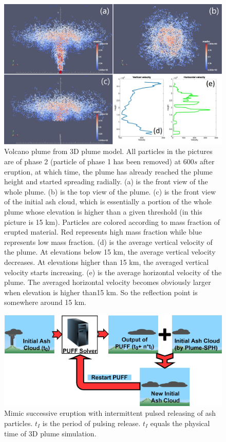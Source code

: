 \documentclass[utf8]{frontiersSCNS} %
\begin{document}
\begin{figure}[!htb]
\centering
\includegraphics[width=1.0\textwidth]{Figures/Plume-SPH-Results}
\caption{Volcano plume from 3D plume model. All particles in the pictures are of  phase 2 (particle of phase 1 has been removed) at $600s$ after eruption, at which time, the plume has already reached the plume height and started spreading radially. (a) is the front view of the whole plume. (b) is the top view of the plume. (c) is the front view of the initial ash cloud, which is essentially a portion of the whole plume whose elevation is higher than a given threshold (in this picture is 15 km). Particles are colored according to mass fraction of erupted material. Red represents high mass fraction while blue represents low mass fraction. (d) is the average vertical velocity of the plume. At elevations below 15 km, the average vertical velocity decreases. At elevations higher than 15 km, the averaged vertical velocity starts increasing. (e) is the average horizontal velocity of the plume. The averaged horizontal velocity becomes obviously larger when elevation is higher than15 km. So the reflection point is somewhere around 15 km.}
\label{fig:Plume-SPH-Pinatubo-ash-cloud}
\end{figure}

\begin{figure}
\center
\includegraphics[width=0.90 \textwidth]{Figures/Restart-Puff}
\caption{Mimic successive eruption with intermittent pulsed releasing of ash particles. $t_I$ is the period of pulsing release. $t_I$ equals the physical time of 3D plume simulation.}
\label{fig:Restart-Puff}
\end{figure}
\end{document}
